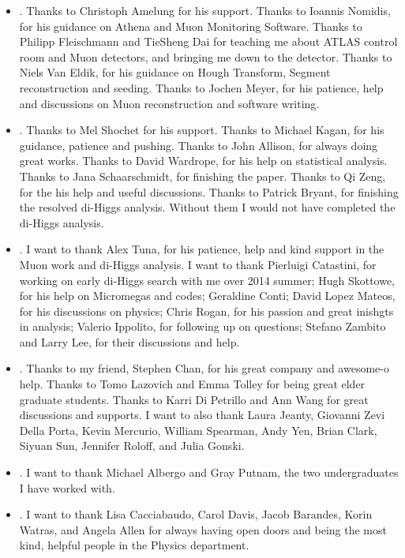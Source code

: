 \begin{itemize}
	\item {}. Thanks to Christoph Amelung for his support. Thanks to Ioannis Nomidis, for his guidance on Athena and Muon Monitoring Software. Thanks to Philipp Fleischmann and TieSheng Dai for teaching me about ATLAS control room and Muon detectors, and bringing me down to the detector. Thanks to Niels Van Eldik, for his guidance on Hough Transform, Segment reconstruction and seeding. Thanks to Jochen Meyer, for his patience, help and discussions on Muon reconstruction and software writing.
	\item {}. Thanks to Mel Shochet for his support. Thanks to Michael Kagan, for his guidance, patience and pushing. Thanks to John Allison, for always doing great works. Thanks to David Wardrope, for his help on statistical analysis. Thanks to Jana Schaarschmidt, for finishing the paper. Thanks to Qi Zeng, for the his help and useful discussions. Thanks to Patrick Bryant, for finishing the resolved di-Higgs analysis. Without them I would not have completed the di-Higgs analysis.
	\item {}. I want to thank Alex Tuna, for his patience, help and kind support in the Muon work and di-Higgs analysis. I want to thank Pierluigi Catastini, for working on early di-Higgs search with me over 2014 summer; Hugh Skottowe, for his help on Micromegas and codes; Geraldine Conti; David Lopez Mateos, for his discussions on physics; Chris Rogan, for his passion and great inishgts in analysis; Valerio Ippolito, for following up on questions; Stefano Zambito and Larry Lee, for their discussions and help.
	\item {}. Thanks to my friend, Stephen Chan, for his great company and awesome-o help. Thanks to Tomo Lazovich and Emma Tolley for being great elder graduate students. Thanks to Karri Di Petrillo and Ann Wang for great discussions and supports. I want to also thank Laura Jeanty, Giovanni Zevi Della Porta, Kevin Mercurio, William Spearman, Andy Yen, Brian Clark, Siyuan Sun, Jennifer Roloff, and Julia Gonski.
	\item {}. I want to thank Michael Albergo and Gray Putnam, the two undergraduates I have worked with.
	\item {}. I want to thank Lisa Cacciabaudo, Carol Davis, Jacob Barandes, Korin Watras, and Angela Allen for always having open doors and being the most kind, helpful people in the Physics department. 

\end{itemize}

